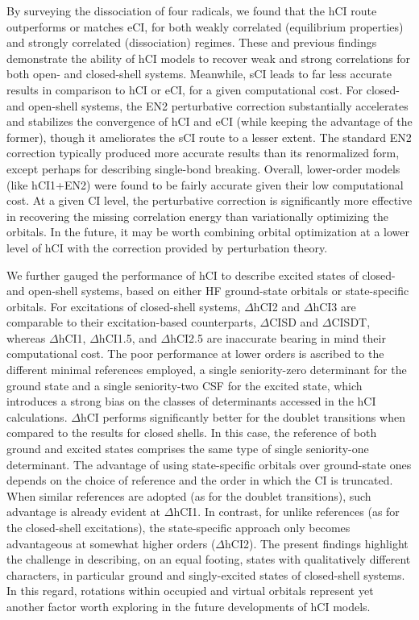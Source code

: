 \documentclass[aip,jcp,reprint,noshowkeys,superscriptaddress]{revtex4-1}
\begin{document}
By surveying the dissociation of four radicals,
we found that the hCI route outperforms or matches eCI, for both weakly correlated (equilibrium properties) and strongly correlated (dissociation) regimes.
These and previous \cite{Kossoski_2022} findings demonstrate the ability of hCI models to recover weak and strong correlations for both open- and closed-shell systems.
Meanwhile, sCI leads to far less accurate results in comparison to hCI or eCI, for a given computational cost.
For closed- and open-shell systems, the EN2 perturbative correction
substantially accelerates and stabilizes the convergence of hCI and eCI (while keeping the advantage of the former),
though it ameliorates the sCI route to a lesser extent.
The standard EN2 correction typically produced more accurate results than its renormalized form, except perhaps for describing single-bond breaking.
Overall, lower-order models (like hCI1+EN2) were found to be fairly accurate given their low computational cost.
At a given CI level, the perturbative correction is significantly more effective in recovering the missing correlation energy than variationally optimizing the orbitals. \cite{Kossoski_2022}
In the future, it may be worth combining orbital optimization at a lower level of hCI \cite{Kossoski_2022} with the correction provided by perturbation theory.

We further gauged the performance of hCI to describe excited states of closed- and open-shell systems, based on either HF ground-state orbitals or state-specific orbitals.
For excitations of closed-shell systems, $\Delta$hCI2 and $\Delta$hCI3 are comparable to their excitation-based counterparts, $\Delta$CISD and $\Delta$CISDT,
whereas $\Delta$hCI1, $\Delta$hCI1.5, and $\Delta$hCI2.5 are inaccurate bearing in mind their computational cost.
The poor performance at lower orders is ascribed to the different minimal references employed,
a single seniority-zero determinant for the ground state and a single seniority-two CSF for the excited state,
which introduces a strong bias on the classes of determinants accessed in the hCI calculations.
$\Delta$hCI performs significantly better for the doublet transitions when compared to the results for closed shells.
In this case, the reference of both ground and excited states comprises the same type of single seniority-one determinant.
The advantage of using state-specific orbitals over ground-state ones depends on the choice of reference and the order in which the CI is truncated.
When similar references are adopted (as for the doublet transitions), such advantage is already evident at $\Delta$hCI1.
In contrast, for unlike references (as for the closed-shell excitations), the state-specific approach only becomes advantageous at somewhat higher orders ($\Delta$hCI2).
The present findings highlight the challenge in describing, on an equal footing, states with qualitatively different characters, in particular ground and singly-excited states of closed-shell systems.
In this regard, rotations within occupied and virtual orbitals represent yet another factor worth exploring in the future developments of hCI models.
\end{document}
